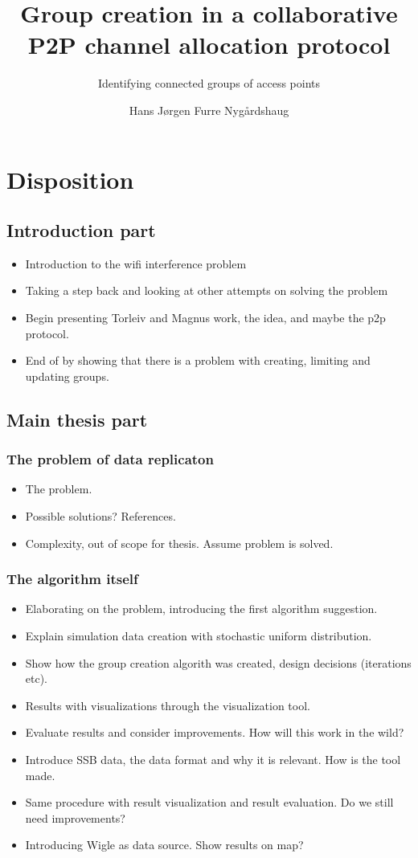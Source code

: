 \documentclass[a4paper,UKenglish]{report}
\title{Group creation in a collaborative P2P channel allocation protocol}
\subtitle{Identifying connected groups of access points}
\author{Hans Jørgen Furre Nygårdshaug}
\begin{document}
\duoforside[dept={Institutt for informatikk},
  program={Informatikk: programmering og nettverk},
  long]

\section{Disposition} 
\subsection {Introduction part}
\begin{itemize} 
	\item Introduction to the wifi interference problem
	\item Taking a step back and looking at other attempts on solving the problem
	\item Begin presenting Torleiv and Magnus work, the idea, and maybe the p2p protocol.
	\item End of by showing that there is a problem with creating, limiting and updating groups.
\end{itemize}

\subsection {Main thesis part}
\subsubsection{The problem of data replicaton} 
\begin{itemize} 
	\item The problem.
	\item Possible solutions? References.
	\item Complexity, out of scope for thesis. Assume problem is solved.
\end{itemize} 
\subsubsection{The algorithm itself} 
\begin{itemize} 
	\item Elaborating on the problem, introducing the first algorithm suggestion.
	\item Explain simulation data creation with stochastic uniform distribution.
	\item Show how the group creation algorith was created, design decisions (iterations etc).
	\item Results with visualizations through the visualization tool. 
	\item Evaluate results and consider improvements. How will this work in the wild?
	\item Introduce SSB data, the data format and why it is relevant. How is the tool made.
	\item Same procedure with result visualization and result evaluation. Do we still need improvements?
	\item Introducing Wigle as data source. Show results on map?
\end{itemize}
\end{document}
